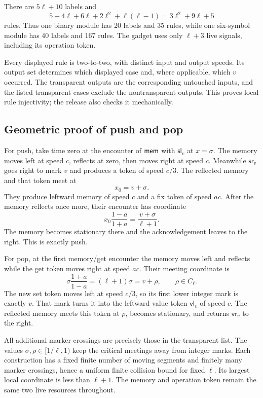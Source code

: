 \documentclass[11pt,letterpaper]{article}
\numberwithin{equation}{section}
\theoremstyle{definition}
\theoremstyle{remark}
\newcommand{\sig}{\sigma}\newcommand{\blank}{\mathsf b}
\newcommand{\lab}[1]{\mathsf{#1}}\newcommand{\diag}{\operatorname{diag}}
\begin{document}
There are $5\ell+10$ labels and
\begin{equation}\label{smc:cs:eq:module-count}
 5+4\ell+6\ell+2\ell^2+\ell(\ell-1)
 =3\ell^2+9\ell+5
\end{equation}
rules. Thus one binary module has 20 labels and 35 rules, while one six-symbol module has 40 labels and 167 rules. The gadget uses only $\ell+3$ live signals, including its operation token.

Every displayed rule is two-to-two, with distinct input and output speeds. Its output set determines which displayed case and, where applicable, which $v$ occurred. The transparent outputs are the corresponding untouched inputs, and the listed transparent cases exclude the nontransparent outputs. This proves local rule injectivity; the release also checks it mechanically.

\subsection{Geometric proof of push and pop}\label{smc:cs:sec:geometry}
For push, take time zero at the encounter of $\mathsf{mem}$ with $\lab{sl}_v$ at $x=\sig$. The memory moves left at speed $c$, reflects at zero, then moves right at speed $c$. Meanwhile $\lab{sr}_v$ goes right to mark $v$ and produces a token of speed $c/3$. The reflected memory and that token meet at
\[
 x_0=v+\sig.
\]
They produce leftward memory of speed $c$ and a fix token of speed $ac$. After the memory reflects once more, their encounter has coordinate
\[
 x_0\frac{1-a}{1+a}=\frac{v+\sig}{\ell+1}.
\]
The memory becomes stationary there and the acknowledgement leaves to the right. This is exactly push.

For pop, at the first memory/get encounter the memory moves left and reflects while the get token moves right at speed $ac$. Their meeting coordinate is
\[
 \sig\frac{1+a}{1-a}=(\ell+1)\sig=v+\rho,
 \qquad \rho\in C_\ell.
\]
The new set token moves left at speed $c/3$, so its first lower integer mark is exactly $v$. That mark turns it into the leftward value token $\lab{vl}_v$ of speed $c$. The reflected memory meets this token at $\rho$, becomes stationary, and returns $\lab{vr}_v$ to the right.

All additional marker crossings are precisely those in the transparent list. The values $\sig,\rho\in[1/\ell,1)$ keep the critical meetings away from integer marks. Each construction has a fixed finite number of moving segments and finitely many marker crossings, hence a uniform finite collision bound for fixed $\ell$. Its largest local coordinate is less than $\ell+1$. The memory and operation token remain the same two live resources throughout.
\end{document}
